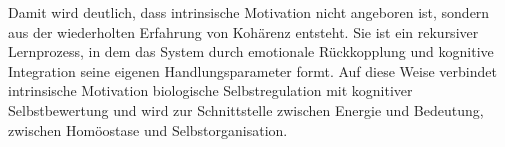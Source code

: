 Damit wird deutlich, dass intrinsische Motivation nicht angeboren ist, sondern aus der wiederholten Erfahrung von Kohärenz entsteht. Sie ist ein rekursiver Lernprozess, in dem das System durch emotionale Rückkopplung und kognitive Integration seine eigenen Handlungsparameter formt. Auf diese Weise verbindet intrinsische Motivation biologische Selbstregulation mit kognitiver Selbstbewertung und wird zur Schnittstelle zwischen Energie und Bedeutung, zwischen Homöostase und Selbstorganisation.



%
%
%
%


